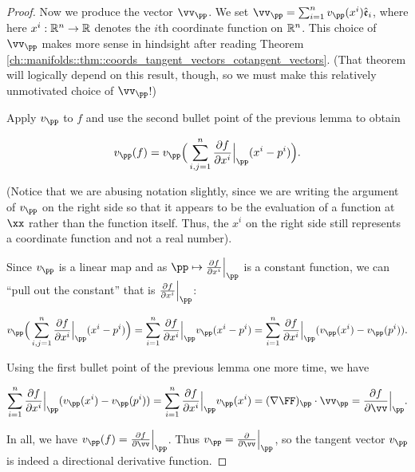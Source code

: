 \begin{proof}
    Now we produce the vector $\vv_\pp$. We set $\vv_\pp = \sum_{i = 1}^n v_\pp(x^i) \see_i$, where here $x^i:\mathbb{R}^n \rightarrow \mathbb{R}$ denotes the $i$th coordinate function on $\mathbb{R}^n$. This choice of $\vv_\pp$ makes more sense in hindsight after reading Theorem \ref{ch::manifolds::thm::coords_tangent_vectors_cotangent_vectors}. (That theorem will logically depend on this result, though, so we must make this relatively unmotivated choice of $\vv_\pp$!)
    
    Apply $v_\pp$ to $f$ and use the second bullet point of the previous lemma to obtain
    
    \begin{align*}
        v_\pp(f) 
        = v_\pp\Big(\sum_{i,j = 1}^n \frac{\pd f}{\pd x^i}\Big|_\pp (x^i - p^i)\Big).
    \end{align*}

    (Notice that we are abusing notation slightly, since we are writing the argument of $v_\pp$ on the right side so that it appears to be the evaluation of a function at $\xx$ rather than the function itself. Thus, the $x^i$ on the right side still represents a coordinate function and not a real number).
    
    Since $v_\pp$ is a linear map and as $\pp \mapsto \frac{\pd f}{\pd x^i}\Big|_\pp$ is a constant function, we can ``pull out the constant'' that is $\frac{\pd f}{\pd x^i}\Big|_\pp$:
    
    \begin{align*}
        v_\pp\Big(\sum_{i,j = 1}^n \frac{\pd f}{\pd x^i}\Big|_\pp (x^i - p^i)\Big)
        = \sum_{i = 1}^n \frac{\pd f}{\pd x^i}\Big|_\pp v_\pp(x^i - p^i)
        = \sum_{i = 1}^n \frac{\pd f}{\pd x^i}\Big|_\pp (v_\pp(x^i) - v_\pp(p^i)).
    \end{align*}
    
    Using the first bullet point of the previous lemma one more time, we have
    
    \begin{align*}
        \sum_{i = 1}^n \frac{\pd f}{\pd x^i}\Big|_\pp (v_\pp(x^i) - v_\pp(p^i)) 
        = \sum_{i = 1}^n \frac{\pd f}{\pd x^i}\Big|_\pp v_\pp(x^i)
        = (\nabla \FF)_\pp \cdot \vv_\pp
        = \frac{\pd f}{\pd \vv}\Big|_\pp.
    \end{align*}
    
    In all, we have $v_\pp(f) = \frac{\pd f}{\pd \vv}\Big|_\pp$. Thus $v_\pp = \frac{\pd}{\pd \vv}\Big|_\pp$, so the tangent vector $v_\pp$ is indeed a directional derivative function. 
\end{proof}

